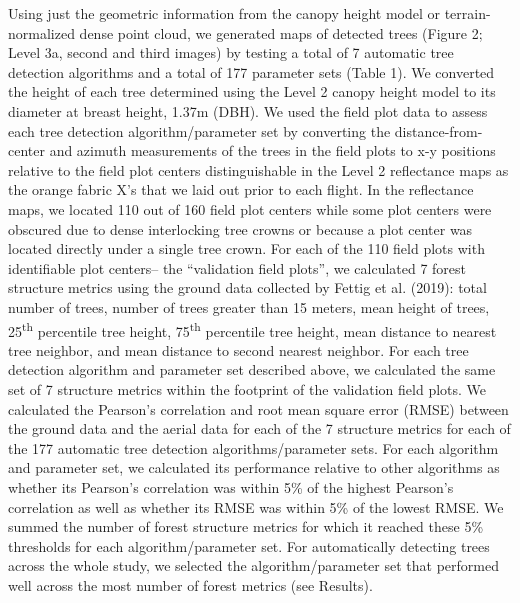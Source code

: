 \documentclass[]{article}
\begin{document}
Using just the geometric information from the canopy height model or
terrain-normalized dense point cloud, we generated maps of detected
trees (Figure 2; Level 3a, second and third images) by testing a total
of 7 automatic tree detection algorithms and a total of 177 parameter
sets (Table 1). We converted the height of each tree determined using
the Level 2 canopy height model to its diameter at breast height, 1.37m
(DBH). We used the field plot data to assess each tree detection
algorithm/parameter set by converting the distance-from-center and
azimuth measurements of the trees in the field plots to x-y positions
relative to the field plot centers distinguishable in the Level 2
reflectance maps as the orange fabric X's that we laid out prior to each
flight. In the reflectance maps, we located 110 out of 160 field plot
centers while some plot centers were obscured due to dense interlocking
tree crowns or because a plot center was located directly under a single
tree crown. For each of the 110 field plots with identifiable plot
centers-- the ``validation field plots'', we calculated 7 forest
structure metrics using the ground data collected by Fettig et al.
(2019): total number of trees, number of trees greater than 15 meters,
mean height of trees, 25\textsuperscript{th} percentile tree height,
75\textsuperscript{th} percentile tree height, mean distance to nearest
tree neighbor, and mean distance to second nearest neighbor. For each
tree detection algorithm and parameter set described above, we
calculated the same set of 7 structure metrics within the footprint of
the validation field plots. We calculated the Pearson's correlation and
root mean square error (RMSE) between the ground data and the aerial
data for each of the 7 structure metrics for each of the 177 automatic
tree detection algorithms/parameter sets. For each algorithm and
parameter set, we calculated its performance relative to other
algorithms as whether its Pearson's correlation was within 5\% of the
highest Pearson's correlation as well as whether its RMSE was within 5\%
of the lowest RMSE. We summed the number of forest structure metrics for
which it reached these 5\% thresholds for each algorithm/parameter set.
For automatically detecting trees across the whole study, we selected
the algorithm/parameter set that performed well across the most number
of forest metrics (see Results).
\end{document}
